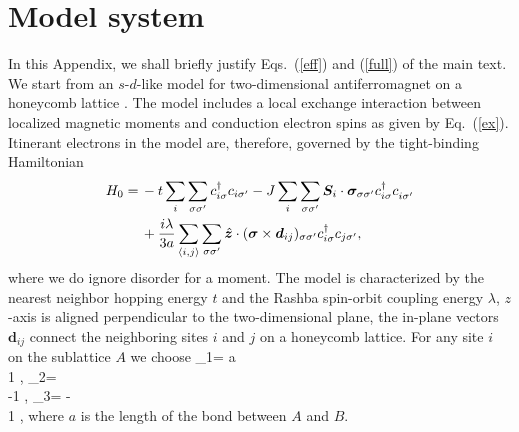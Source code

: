 

\section{Model system}\label{sec:appa}

In this Appendix, we shall briefly justify Eqs.~(\ref{eff}) and (\ref{full}) of the main text. We start from an $s$-$d$-like model for two-dimensional antiferromagnet on a honeycomb lattice \cite{Sumit2019}. The model includes a local exchange interaction between localized magnetic moments and conduction electron spins as given by Eq.~(\ref{ex}). Itinerant electrons in the model are, therefore, governed by the tight-binding Hamiltonian 
\begin{align}
H_0=\,&-t\sum\limits_{i}\s_{\sigma\sigma'}c_{i\sigma}^\dagger c_{i\sigma'}
-J \s_{i} \s_{\sigma\sigma'}\bb{S}_i\cdot \bb{\sigma}_{\sigma\sigma'}c^\dagger_{i\sigma}c\0_{i\sigma'}\n\\
&+\frac{i\lambda}{3a}\s_{\langle i,j\rangle}\sum\limits_{\sigma\sigma'}\hat{\bm{z}}\cdot(\bm{\sigma}\times\bm{d}_{ij})_{\sigma\sigma'}c_{i\sigma}^\dagger c_{j\sigma'},
\label{htb}
\end{align}
where we do ignore disorder for a moment. The model is characterized by the nearest neighbor hopping energy $t$ and the Rashba spin-orbit coupling energy $\lambda$, $z$-axis is aligned perpendicular to the two-dimensional plane, the in-plane vectors $\bm{d}_{ij}$ connect the neighboring sites $i$ and $j$ on a honeycomb lattice. For any site $i$ on the sublattice $A$ we choose
\be
{}_{1}= a  \\ 1 \epm, \quad {}_{2}=  \bpm {} \\ -1 \epm , \quad {}_{3}= - \bpm {}  \\ 1 \epm,
\e
where $a$ is the length of the bond between $A$ and $B$.

